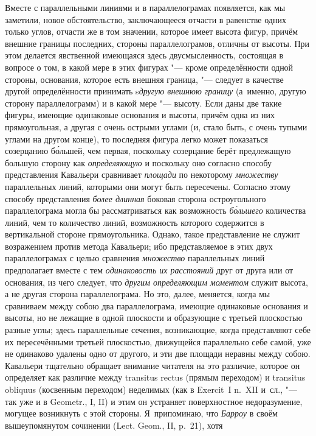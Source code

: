 Вместе с параллельными линиями и в параллелограмах появляется, как мы заметили,
новое обстоятельство, заключающееся отчасти в равенстве одних только углов,
отчасти же в том значении, которое имеет высота фигур, причём внешние границы
последних, стороны параллелограмов, отличны от высоты. При этом делается
явственной имеющаяся здесь двусмысленность, состоящая в вопросе о том, в какой
мере в этих фигурах "--- кроме определённости одной стороны, основания, которое
есть внешняя граница, "--- следует в качестве другой определённости принимать
s{\em другую внешнюю границу} (а~именно, другую сторону параллелограмм) и в
какой мере "--- высоту. Если даны две такие фигуры, имеющие одинаковые
основания и высоты, причём одна из них прямоугольная, а другая с очень острыми
углами (и, стало быть, с очень тупыми углами на другом конце), то последняя
фигура легко может показаться созерцанию б\'{о}льшей, чем первая, поскольку
созерцание берёт предлежащую большую сторону как {\em определяющую} и поскольку
оно согласно способу представления Кавальери сравнивает {\em площади} по
некоторому {\em множеству} параллельных линий, которыми они могут быть
пересечены. Согласно этому способу представления {\em более длинная} боковая
сторона остроугольного параллелограма могла бы рассматриваться как возможность
{\em б\'{о}льшего} количества линий, чем то количество линий, возможность
которого содержится в вертикальной стороне прямоугольника. Однако, такое
представление не служит возражением против метода Кавальери; ибо представляемое
в этих двух параллелограмах с целью сравнения {\em множество} параллельных
линий предполагает вместе с тем {\em одинаковость их расстояний} друг от друга
или от основания, из чего следует, что {\em другим определяющим моментом}
служит высота, а не другая сторона параллелограма. Но это, далее, меняется,
когда мы сравниваем между собою два параллелограма, имеющие одинаковые
основания и высоты, но не лежащие в одной плоскости и образующие с третьей
плоскостью разные углы; здесь параллельные сечения, возникающие, когда
представляют себе их пересечёнными третьей плоскостью, движущейся параллельно
себе самой, уже не одинаково удалены одно от другого, и эти две площади неравны
между собою. Кавальери тщательно обращает внимание читателя на это различие,
которое он определяет как различие между transitus rectus (прямым переходом) и
transitus obliquus (косвенным переходом) неделимых (как в Exercit~I n.~XII
и~сл., "--- так уже и в Geometr., I, II) и этим он устраняет поверхностное
недоразумение, могущее возникнуть с этой стороны. Я~припоминаю, что
{\em Барроу} в своём вышеупомянутом сочинении (Lect. Geom., II, p.~21), хотя
